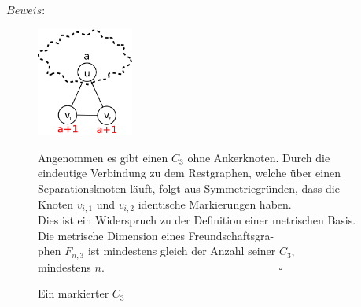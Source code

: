 $Beweis:$
\vspace{-7mm}
\begin{figure}
\vspace{-7mm}
\begin{minipage}[l]{170pt}
\centering
\includegraphics[width=90pt]{bilder/freundschaftsgraphbew.pdf}
\caption{Ein markierter $C_3$}
\end{minipage}
\begin{minipage}[r]{250pt}
Angenommen es gibt einen $C_3$ ohne Ankerknoten. Durch die eindeutige Verbindung zu dem Restgraphen, welche über einen Separationsknoten läuft, folgt aus Symmetriegründen, dass die Knoten $v_{i,1}$ und $v_{i,2}$ identische Markierungen haben.\\Dies ist ein Widerspruch zu der Definition einer metrischen Basis.\\
Die metrische Dimension eines Freundschaftsgra-\\phen $F_{n,3}$ ist mindestens gleich der Anzahl seiner $C_{3}$,\\mindestens $n$.$\;\;\;\;\;\;\;\;\;\;\;\;\;\;\;\;\;\;\;\;\;\;\;\;\;\;\;\;\;\;\;\;\;\;\;\;\;\;\;\;\;\;\;\;\;\;\;\;\;\;\;\;\;\;\;\;\;\square$
\end{minipage}
\end{figure}

